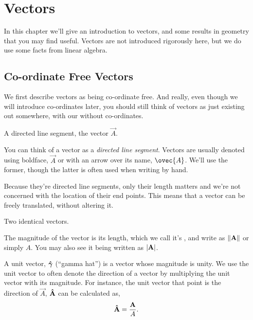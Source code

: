 \setlength{\chnumsep}{14em}
\chapter{Vectors}

\begin{overview}
In this chapter we'll give an introduction to vectors, and some results in
geometry that you may find useful. Vectors are not introduced rigorously here,
but we do use some facts from linear algebra.
\end{overview}

\section{Co-ordinate Free Vectors}

We first describe vectors as being co-ordinate free. And really, even
though we will introduce co-ordinates later, you should still
think of vectors as just existing out somewhere, with our without
co-ordinates.

\begin{marginfigure}
\caption{A directed line segment, the vector \(\vec{A}\).}
\end{marginfigure}

You can think of a  vector as a \emph{directed line segment}.
Vectors are usually denoted using boldface, \(\vec{A}\) or with an arrow over its name,
\(\ovec{A}\). We'll use the former, though the latter is often used when writing by hand.


Because they're directed line segments, only their length matters and
we’re not concerned with the location of their end points. This means that a
vector can be freely translated, without altering it.

\begin{marginfigure}
\caption{Two identical vectors.}
\end{marginfigure}

The magnitude of the vector is its length, which we call it's , and write
as \(\norm{\boldsymbol{\mathbf{A}}}\) or simply \(A\). You may also see it being written as \(\abs{\boldsymbol{\mathbf{A}}}\).

A unit vector, \(\boldsymbol{\mathbf{\hat{\gamma}}}\) (“gamma hat”) is a vector whose magnitude is unity. We use the unit vector to
often denote the direction of a vector by multiplying the unit vector with its magnitude.
For instance, the unit vector that point is the direction of \(\vec{A}\), \(\boldsymbol{\mathbf{\hat{A}}}\) can be calculated as,
\[
\boldsymbol{\mathbf{\hat{A}}} = \frac{\boldsymbol{\mathbf{A}}}{A}.
\]
